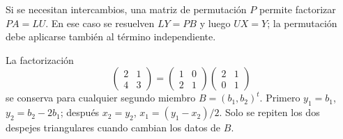 Si se necesitan intercambios, una matriz de permutación $P$ permite
factorizar $PA=LU$. En ese caso se resuelven $LY=PB$ y luego $UX=Y$;
la permutación debe aplicarse también al término independiente.

\begin{ejemplo}
La factorización
\[
 \begin{pmatrix}2&1\\4&3\end{pmatrix}
 =\begin{pmatrix}1&0\\2&1\end{pmatrix}
  \begin{pmatrix}2&1\\0&1\end{pmatrix}
\]
se conserva para cualquier segundo miembro $B=(b_1,b_2)^t$.
Primero $y_1=b_1$, $y_2=b_2-2b_1$; después
$x_2=y_2$, $x_1=(y_1-x_2)/2$. Solo se repiten los dos despejes
triangulares cuando cambian los datos de $B$.
\end{ejemplo}
